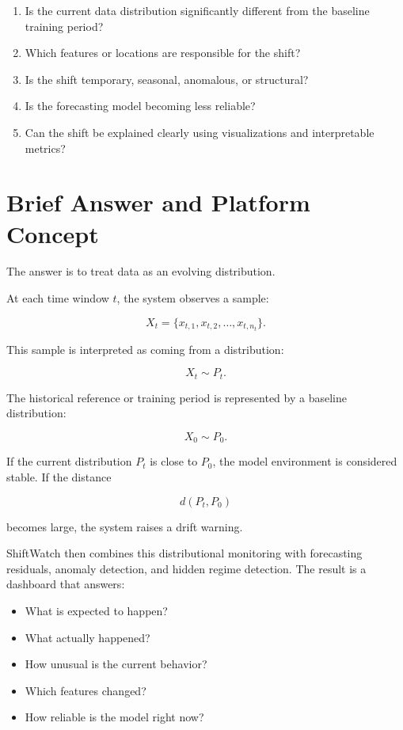 \documentclass[11pt]{article}
\begin{document}
\begin{enumerate}
    \item Is the current data distribution significantly different from the baseline training period?
    \item Which features or locations are responsible for the shift?
    \item Is the shift temporary, seasonal, anomalous, or structural?
    \item Is the forecasting model becoming less reliable?
    \item Can the shift be explained clearly using visualizations and interpretable metrics?
\end{enumerate}

\section{Brief Answer and Platform Concept}

The answer is to treat data as an evolving distribution.

At each time window $t$, the system observes a sample:

\[
    X_t = \{x_{t,1}, x_{t,2}, \ldots, x_{t,n_t}\}.
\]

This sample is interpreted as coming from a distribution:

\[
    X_t \sim P_t.
\]

The historical reference or training period is represented by a baseline distribution:

\[
    X_0 \sim P_0.
\]

If the current distribution $P_t$ is close to $P_0$, the model environment is considered stable. If the distance

\[
    d(P_t, P_0)
\]

becomes large, the system raises a drift warning.

ShiftWatch then combines this distributional monitoring with forecasting residuals, anomaly detection, and hidden regime detection. The result is a dashboard that answers:

\begin{itemize}
    \item What is expected to happen?
    \item What actually happened?
    \item How unusual is the current behavior?
    \item Which features changed?
    \item How reliable is the model right now?
\end{itemize}
\end{document}
